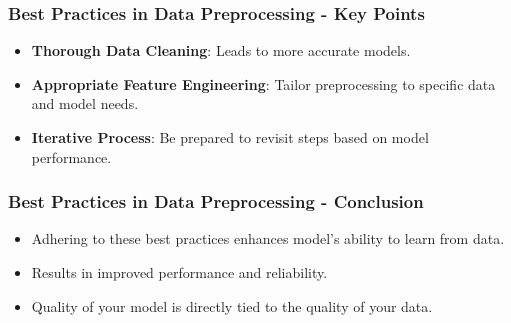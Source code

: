 \documentclass[aspectratio=169]{beamer}
\begin{document}
\begin{frame}[fragile]
    \frametitle{Best Practices in Data Preprocessing - Key Points}
    \begin{itemize}
        \item \textbf{Thorough Data Cleaning}: Leads to more accurate models.
        \item \textbf{Appropriate Feature Engineering}: Tailor preprocessing to specific data and model needs.
        \item \textbf{Iterative Process}: Be prepared to revisit steps based on model performance.
    \end{itemize}
\end{frame}

\begin{frame}[fragile]
    \frametitle{Best Practices in Data Preprocessing - Conclusion}
    \begin{itemize}
        \item Adhering to these best practices enhances model's ability to learn from data.
        \item Results in improved performance and reliability.
        \item Quality of your model is directly tied to the quality of your data.
    \end{itemize}
\end{frame}
\end{document}
